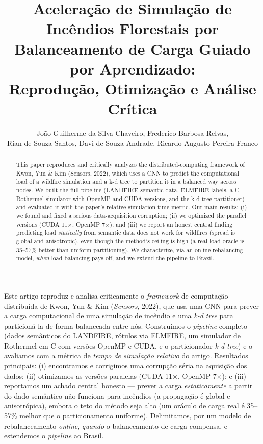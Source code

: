 \documentclass[12pt]{article}
\title{Aceleração de Simulação de Incêndios Florestais por Balanceamento de
  Carga Guiado por Aprendizado:\\ Reprodução, Otimização e Análise Crítica}
\author{João Guilherme da Silva Chaveiro\inst{1}, Frederico Barbosa Relvas\inst{1},\\
    Rian de Souza Santos\inst{1}, Davi de Souza Andrade\inst{1}, Ricardo Augusto Pereira Franco\inst{1}}
\begin{document}
\maketitle

\begin{abstract}
  This paper reproduces and critically analyzes the distributed-computing
  framework of Kwon, Yun \& Kim (Sensors, 2022), which uses a CNN to predict the
  computational load of a wildfire simulation and a k-d tree to partition it in a
  balanced way across nodes. We built the full pipeline (LANDFIRE semantic data,
  ELMFIRE labels, a C Rothermel simulator with OpenMP and CUDA versions, and the
  k-d tree partitioner) and evaluated it with the paper's relative-simulation-time
  metric. Our main results: (i) we found and fixed a serious data-acquisition
  corruption; (ii) we optimized the parallel versions (CUDA 11$\times$, OpenMP
  7$\times$); and (iii) we report an honest central finding -- predicting load
  \emph{statically} from semantic data does not work for wildfires (spread is
  global and anisotropic), even though the method's ceiling is high (a real-load
  oracle is 35--57\% better than uniform partitioning). We characterize, via an
  online rebalancing model, \emph{when} load balancing pays off, and we extend the
  pipeline to Brazil.
\end{abstract}

\begin{resumo}
  Este artigo reproduz e analisa criticamente o \textit{framework} de computação
  distribuída de Kwon, Yun \& Kim (\textit{Sensors}, 2022), que usa uma CNN para
  prever a carga computacional de uma simulação de incêndio e uma \textit{k-d
  tree} para particioná-la de forma balanceada entre nós. Construímos o
  \textit{pipeline} completo (dados semânticos do LANDFIRE, rótulos via ELMFIRE,
  um simulador de Rothermel em C com versões OpenMP e CUDA, e o particionador
  \textit{k-d tree}) e o avaliamos com a métrica de \textit{tempo de simulação
  relativo} do artigo. Resultados principais: (i) encontramos e corrigimos uma
  corrupção séria na aquisição dos dados; (ii) otimizamos as versões paralelas
  (CUDA 11$\times$, OpenMP 7$\times$); e (iii) reportamos um achado central honesto
  --- prever a carga \emph{estaticamente} a partir do dado semântico não funciona
  para incêndios (a propagação é global e anisotrópica), embora o teto do método
  seja alto (um oráculo de carga real é 35--57\% melhor que o particionamento
  uniforme). Delimitamos, por um modelo de rebalanceamento \textit{online},
  \emph{quando} o balanceamento de carga compensa, e estendemos o
  \textit{pipeline} ao Brasil.
\end{resumo}
\end{document}
